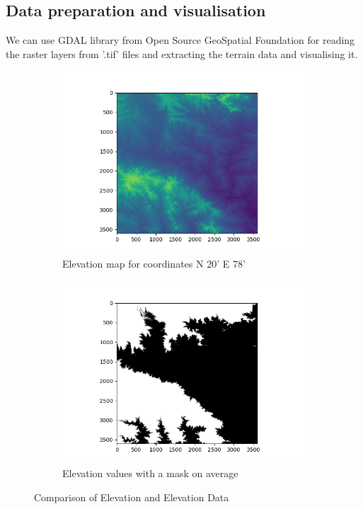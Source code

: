 \documentclass[letterpaper]{article}
\begin{document}
\subsection{Data preparation and visualisation}

We can use GDAL library\cite{GDAL} from Open Source GeoSpatial Foundation for reading the raster layers 
from '.tif' files and extracting the terrain data and visualising it.


\begin{figure}[H]
    \centering
    \begin{subfigure}{0.49\textwidth}
        \centering
        \includegraphics[width=1\textwidth]{Elevation}
        \caption{Elevation map for coordinates N 20' E 78'}\label{fig:Elevation}
    \end{subfigure}
    \hfill
    \begin{subfigure}{0.49\textwidth}
        \centering
        \includegraphics[width=1\textwidth]{Mask}
        \caption{Elevation values with a mask on average}\label{fig:elevation-mask}
    \end{subfigure}
    \caption{Comparison of Elevation and Elevation Data}
\end{figure}
\end{document}
